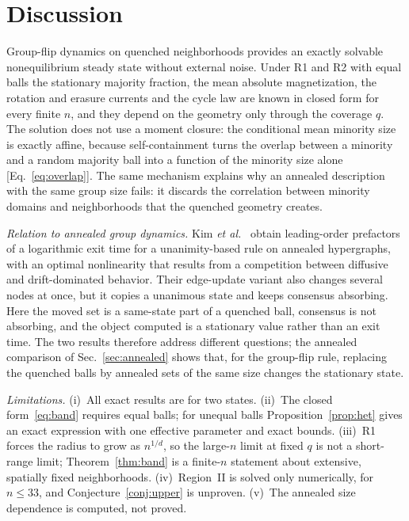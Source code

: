 \documentclass[aps,pre,reprint,superscriptaddress,amsmath,amssymb,longbibliography]{revtex4-2}
\theoremstyle{remark}
\begin{document}
\section{Discussion}
\label{sec:discussion}

Group-flip dynamics on quenched neighborhoods provides an exactly
solvable nonequilibrium steady state without external noise. Under R1
and R2 with equal balls the stationary majority fraction, the mean
absolute magnetization, the rotation and erasure currents and the cycle
law are known in closed form for every finite $n$, and they depend on
the geometry only through the coverage $q$. The solution does not use a
moment closure: the conditional mean minority size is exactly affine,
because self-containment turns the overlap between a minority and a
random majority ball into a function of the minority size alone
[Eq.~\eqref{eq:overlap}]. The same mechanism explains why an annealed
description with the same group size fails: it discards the
correlation between minority domains and neighborhoods that the
quenched geometry creates.

\emph{Relation to annealed group dynamics.} Kim \emph{et
al.}~\cite{Kim2025} obtain leading-order prefactors of a logarithmic
exit time for a unanimity-based rule on annealed hypergraphs, with an
optimal nonlinearity that results from a competition between diffusive
and drift-dominated behavior. Their edge-update variant also changes several nodes at
once, but it copies a unanimous state and keeps consensus absorbing.
Here the moved set is a same-state part of a quenched ball, consensus is
not absorbing, and the object computed is a stationary value rather than
an exit time. The two results therefore address different questions; the
annealed comparison of Sec.~\ref{sec:annealed} shows that, for the
group-flip rule, replacing the quenched balls by annealed sets of the
same size changes the stationary state.

\emph{Limitations.} (i)~All exact results are for two states.
(ii)~The closed form~\eqref{eq:band} requires equal balls; for unequal
balls Proposition~\ref{prop:het} gives an exact expression with one
effective parameter and exact bounds. (iii)~R1 forces the radius to grow
as $n^{1/d}$, so the large-$n$ limit at fixed $q$ is not a short-range
limit; Theorem~\ref{thm:band} is a finite-$n$ statement about extensive,
spatially fixed neighborhoods. (iv)~Region~II is solved only
numerically, for $n\le33$, and Conjecture~\ref{conj:upper} is unproven.
(v)~The annealed size dependence is computed, not proved.
\end{document}
